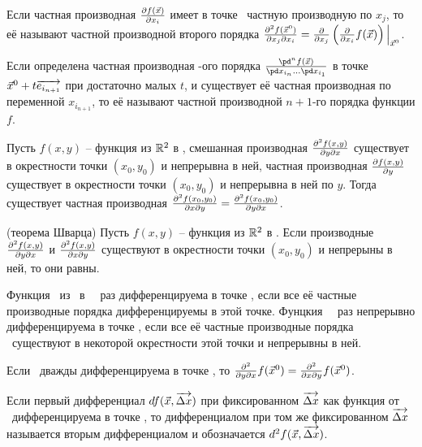 \documentclass[a4paper]{article}
\newcommand{\билет}[1]{\par\medskip\noindent{\large \textsf{Билет #1.}}\par}
\begin{document}
\begin{df} Если частная производная $\frac{\partial f(\vec x)}{\partial x_i}$ имеет в точке \ частную производную  по $x_j$, то её  называют частной производной второго порядка $\frac{\partial^2 f(\vec x^0)}{\partial x_j\partial x_i}=\frac{\partial }{\partial x_j}\left(\frac{\partial }{\partial x_i}f(\vec x)\right)\Bigl|_{\vec x^0}$.
\end{df}

\begin{df} Если определена частная производная \н-ого порядка $\frac{\pd^n f(\vec x)}{\pd x_{i_n}\bnl\pd x_{i_1}}$ в точке $\vec x^0+t\overrightarrow{e_{i_{n+1}}}$ при достаточно малых $t$, и существует её частная производная по переменной $x_{i_{n+1}}$, то её называют частной производной $n+1$-го порядка функции $f$.
\end{df}

\begin{theorem} Пусть $f(x,y)$ -- функция из $\mathbb R^2$ в , смешанная производная $\frac{\partial^2 f(x,y)}{\partial y\partial x}$ существует в окрестности точки $(x_0,y_0)$ и непрерывна в ней, частная производная $\frac{\partial f(x,y)}{\partial y}$ существует в окрестности точки $(x_0,y_0)$ и непрерывна в ней по $y$. Тогда существует частная производная $\frac{\partial^2 f(x_0,y_0)}{\partial x\partial y}=\frac{\partial^2 f(x_0,y_0)}{\partial y\partial x}$.
\end{theorem}

\begin{imp} (теорема Шварца) Пусть $f(x,y)$ -- функция из $\mathbb R^2$ в . Если производные $\frac{\partial^2 f(x,y)}{\partial y\partial x}$ и $\frac{\partial^2 f(x,y)}{\partial x\partial y}$ существуют в окрестности точки $(x_0,y_0)$ и непрерыны в ней, то они равны.
\end{imp}

\begin{df} Функция \ф\ из \ в \ \м\ раз дифференцируема в точке , если все её частные производные порядка  дифференцируемы в этой точке. Фунцкия \ф\ \м\ раз непрерывно дифференцируема в точке , если все её частные производные порядка \м\ существуют в некоторой окрестности этой точки и непрерывны в ней.
\end{df}

\begin{theorem}[Юнга] Если \ф\ дважды дифференцируема в точке , то $\frac{\partial^2 }{\partial y\partial x}f(\vec x^0)=\frac{\partial^2 }{\partial x\partial y}f(\vec x^0)$.
\end{theorem}

\begin{df} Если первый дифференциал $df(\vec x,\overrightarrow{\Delta x})$ при фиксированном $\overrightarrow{\Delta x}$ как функция от \х\ дифференцируема в точке , то дифференциалом при том же фиксированном $\overrightarrow{\Delta x}$ называется вторым дифференциалом и обозначается $d^2f(\vec x,\overrightarrow{\Delta x})$.
\end{df}
\end{document}
